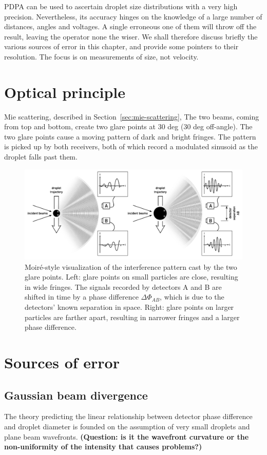 \documentclass[11.5pt]{book}
\newcommand*{\secref}[1]{Section~\ref{#1}}
\begin{document}
PDPA can be used to ascertain droplet size distributions with a very high
precision. Nevertheless, its accuracy hinges on the knowledge of a large number
of distances, angles and voltages. A single erroneous one of them will throw
off the result, leaving the operator none the wiser. We shall therefore discuss
briefly the various sources of error in this chapter, and provide some pointers
to their resolution. The focus is on measurements of size, not velocity.

\section{Optical principle}
Mie scattering, described in \secref{sec:mie-scattering}, 
The two beams, coming from top and bottom, create two glare points at 30 deg (30
deg off-angle). The two glare points cause a moving pattern of dark and bright
fringes. The pattern is picked up by both receivers, both of which record a
modulated sinusoid as the droplet falls past them.
\begin{figure}
    \centering
    \includegraphics[width=\textwidth]{img/setup/pdpa_moire.pdf}
    \caption{Moiré-style visualization of the interference pattern cast by the
    two glare points. Left: glare points on small particles are close, resulting
in wide fringes. The signals recorded by detectors A and B are shifted in time
by a phase difference $\Delta \Phi_{AB}$, which is due to the detectors' known
separation in space. Right: glare points on larger particles are farther apart,
resulting in narrower fringes and a larger phase difference.
\label{fig:pdpa-moire}}
\end{figure}

\section{Sources of error}
\subsection{Gaussian beam divergence}
The theory predicting the linear relationship between detector phase difference
and droplet diameter is founded on the assumption of very small droplets and
plane beam wavefronts. \textbf{(Question: is it the wavefront curvature or the
non-uniformity of the intensity that causes problems?)}
\end{document}
